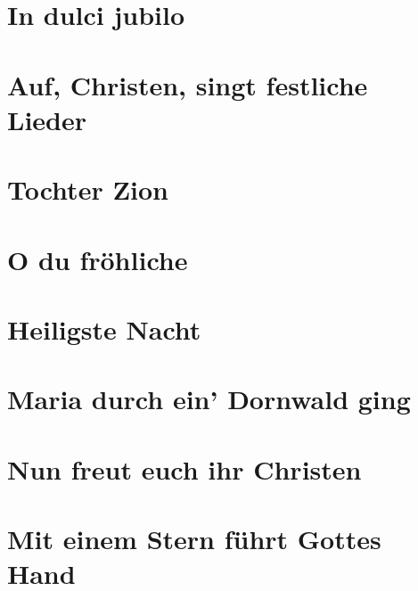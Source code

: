 \documentclass[10pt]{article}
\begin{document}
\section{In dulci jubilo}


\section{Auf, Christen, singt festliche Lieder}

\section{Tochter Zion}

\section{O du fröhliche}

\section{Heiligste Nacht}

\section{Maria durch ein' Dornwald ging}

\section{Nun freut euch ihr Christen}

\section{Mit einem Stern führt Gottes Hand}
\end{document}
